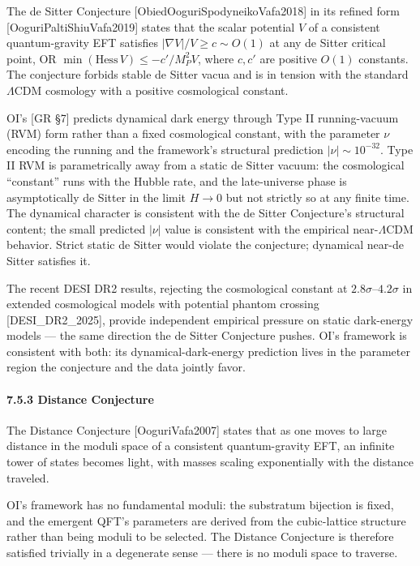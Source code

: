 \documentclass[
]{article}
\begin{document}
The de Sitter Conjecture {[}ObiedOoguriSpodyneikoVafa2018{]} in its
refined form {[}OoguriPaltiShiuVafa2019{]} states that the scalar
potential \(V\) of a consistent quantum-gravity EFT satisfies
\(|\nabla V|/V \geq c \sim O(1)\) at any de Sitter critical point, OR
\(\min(\text{Hess}\,V) \leq -c'/M_P^2 V\), where \(c, c'\) are positive
\(O(1)\) constants. The conjecture forbids stable de Sitter vacua and is
in tension with the standard \(\Lambda\)CDM cosmology with a positive
cosmological constant.

OI's {[}GR §7{]} predicts dynamical dark energy through Type II
running-vacuum (RVM) form rather than a fixed cosmological constant,
with the parameter \(\nu\) encoding the running and the framework's
structural prediction \(|\nu| \sim 10^{-32}\). Type II RVM is
parametrically away from a static de Sitter vacuum: the cosmological
``constant'' runs with the Hubble rate, and the late-universe phase is
asymptotically de Sitter in the limit \(H \to 0\) but not strictly so at
any finite time. The dynamical character is consistent with the de
Sitter Conjecture's structural content; the small predicted \(|\nu|\)
value is consistent with the empirical near-\(\Lambda\)CDM behavior.
Strict static de Sitter would violate the conjecture; dynamical near-de
Sitter satisfies it.

The recent DESI DR2 results, rejecting the cosmological constant at
\(2.8\sigma\)--\(4.2\sigma\) in extended cosmological models with
potential phantom crossing {[}DESI\_DR2\_2025{]}, provide independent
empirical pressure on static dark-energy models --- the same direction
the de Sitter Conjecture pushes. OI's framework is consistent with both:
its dynamical-dark-energy prediction lives in the parameter region the
conjecture and the data jointly favor.

\hypertarget{distance-conjecture}{%
\paragraph{7.5.3 Distance Conjecture}\label{distance-conjecture}}

The Distance Conjecture {[}OoguriVafa2007{]} states that as one moves to
large distance in the moduli space of a consistent quantum-gravity EFT,
an infinite tower of states becomes light, with masses scaling
exponentially with the distance traveled.

OI's framework has no fundamental moduli: the substratum bijection is
fixed, and the emergent QFT's parameters are derived from the
cubic-lattice structure rather than being moduli to be selected. The
Distance Conjecture is therefore satisfied trivially in a degenerate
sense --- there is no moduli space to traverse.
\end{document}
